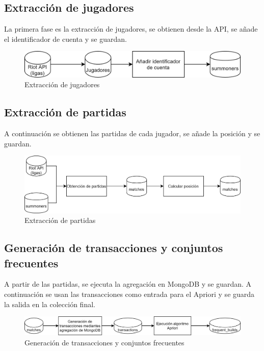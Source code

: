 \subsection{Extracción de jugadores}
La primera fase es la extracción de jugadores, se obtienen desde la API, se añade el identificador de cuenta y se guardan.
\begin{figure}[h]
	\centering
	\includegraphics[width=1\linewidth]{img/diag-summoners}
	\caption{Extracción de jugadores}
	\label{fig:diag-summoners}
\end{figure}

\subsection{Extracción de partidas}
A continuación se obtienen las partidas de cada jugador, se añade la posición y se guardan.
\begin{figure}[h]
	\centering
	\includegraphics[width=1\linewidth]{img/diag-matches}
	\caption{Extracción de partidas}
	\label{fig:diag-matches}
\end{figure}

\subsection{Generación de transacciones y conjuntos frecuentes}
A partir de las partidas, se ejecuta la agregación en MongoDB y se guardan. A continuación se usan las transacciones como entrada para el Apriori y se guarda la salida en la colección final.
\begin{figure}[h]
	\centering
	\includegraphics[width=1\linewidth]{img/diag-transform}
	\caption{Generación de transacciones y conjuntos frecuentes}
	\label{fig:diag-transform}
\end{figure}